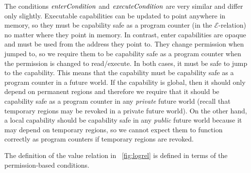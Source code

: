 \documentclass[compsoc,conference,letterpaper,fleqn]{IEEEtran}
\newcommand{\plainfun}[2]{
  \ifthenelse{\equal{#2}{}}
  {\mathit{#1}}
  {\mathit{#1}(#2)}
}
\newcommand{\execCond}[1]{\plainfun{executeCondition}{#1}}
\newcommand{\entryCond}[1]{\plainfun{enterCondition}{#1}}
\newcommand{\asmType}{\plaindom{AsmType}}
\newcommand{\plaindom}[1]{\mathrm{#1}}
\newcommand{\intr}[2]{\mathcal{#1}}
\newcommand{\exprintr}[1]{\intr{E}{#1}}
\newcommand{\stder}{\exprintr{\asmType}}
\begin{document}
The conditions $\entryCond{}$ and $\execCond{}$ are very similar and
differ only slightly. Executable capabilities can be updated to point
anywhere in memory, so they must be capability safe as a program
counter (in the $\stder$-relation) no matter where they point in memory. In contrast, enter
capabilities are opaque and must be used from the address they point
to. They change permission when jumped to, so we require them to be
capability safe as a program counter when the permission is changed to
read/execute.
In both cases, it must be safe to jump to the capability. This
means that the capability must be capability safe as a
program counter in a future world. If the capability is global,
then it should only depend on permanent regions and therefore
we require that it should be capability safe as a program counter in any \emph{private}
future world (recall that temporary regions may be revoked in a private future
world). On the other hand, a local capability should be capability
safe in any \emph{public} future world because it may depend on temporary
regions, so we cannot expect them to function correctly as program
counters if temporary regions are revoked.

The definition of the value relation in \figurename~\ref{fig:logrel}
is defined in terms of the permission-based conditions.
\end{document}
